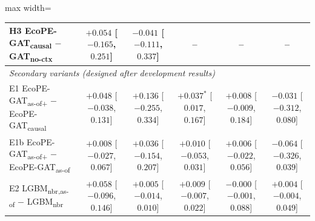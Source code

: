 \documentclass[a4paper,fleqn]{cas-sc}
\newcommand{\Masof}{\mbox{EcoPE-GAT\textsubscript{as-of}}}
\newcommand{\Masofplus}{\mbox{EcoPE-GAT\textsubscript{as-of+}}}
\newcommand{\Mcausal}{\mbox{EcoPE-GAT\textsubscript{causal}}}
\newcommand{\Mnoctx}{\mbox{GAT\textsubscript{no-ctx}}}
\newcommand{\Lnbr}{\mbox{LGBM\textsubscript{nbr}}}
\newcommand{\Lasof}{\mbox{LGBM\textsubscript{nbr,as-of}}}
\begin{document}
\begin{table}[t]
\begin{adjustbox}{max width=\linewidth}
\begin{tabular}{lccccc}
H3 \Mcausal{} $-$ \Mnoctx & $+0.054$ [$-0.165$, $0.251$] & $-0.041$ [$-0.111$, $0.337$] & -- & -- & -- \\
\midrule
\multicolumn{6}{l}{\textit{Secondary variants (designed after development results)}} \\
E1 \Masofplus{} $-$ \Mcausal & $+0.048$ [$-0.038$, $0.131$] & $+0.136$ [$-0.255$, $0.334$] & $+0.037^\ast$ [$0.017$, $0.167$] & $+0.008$ [$-0.009$, $0.184$] & $-0.031$ [$-0.312$, $0.080$] \\
E1b \Masofplus{} $-$ \Masof & $+0.008$ [$-0.027$, $0.067$] & $+0.036$ [$-0.154$, $0.207$] & $+0.010$ [$-0.053$, $0.031$] & $+0.006$ [$-0.022$, $0.056$] & $-0.064$ [$-0.326$, $0.039$] \\
E2 \Lasof{} $-$ \Lnbr & $+0.058$ [$-0.096$, $0.146$] & $+0.005$ [$-0.014$, $0.010$] & $+0.009$ [$-0.007$, $0.022$] & $-0.000$ [$-0.001$, $0.088$] & $+0.004$ [$-0.004$, $0.049$] \\
\bottomrule
\end{tabular}
\end{adjustbox}
\end{table}
\end{document}
